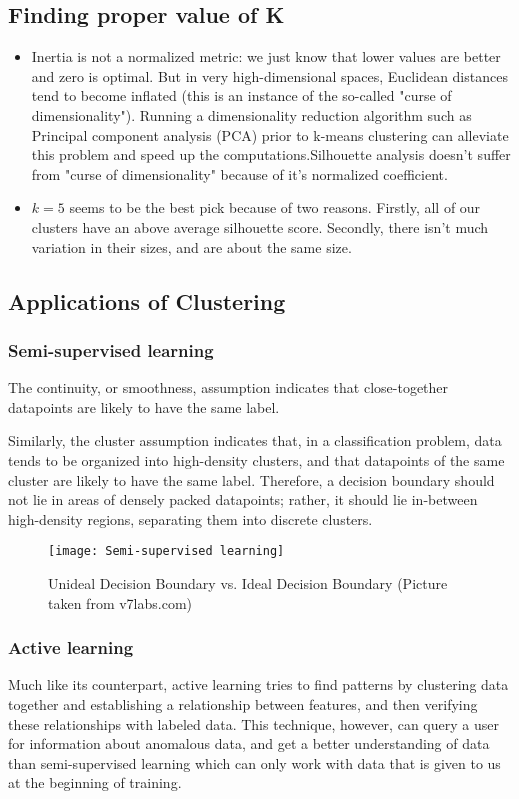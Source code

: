 \documentclass[12pt,onecolumn,a4paper]{article}
\begin{document}
\subsection{Finding proper value of K}
\begin{itemize}
	\item Inertia is not a normalized metric: we just know that lower values are better and zero is optimal. But in very high-dimensional spaces, Euclidean distances tend to become inflated (this is an instance of the so-called "curse of dimensionality"). Running a dimensionality reduction algorithm such as Principal component analysis (PCA) prior to k-means clustering can alleviate this problem and speed up the computations.Silhouette analysis doesn't suffer from "curse of dimensionality" because of it's normalized coefficient.
	\item $k = 5$ seems to be the best pick because of two reasons. Firstly, all of our clusters have an above average silhouette score. Secondly, there isn't much variation in their sizes, and are about the same size.
\end{itemize}
\subsection{Applications of Clustering}
\subsubsection{Semi-supervised learning}
The continuity, or smoothness, assumption indicates that close-together datapoints are likely to have the same label.

Similarly, the cluster assumption indicates that, in a classification problem, data tends to be organized into high-density clusters, and that datapoints of the same cluster are likely to have the same label. Therefore, a decision boundary should not lie in areas of densely packed datapoints; rather, it should lie in-between high-density regions, separating them into discrete clusters.
\begin{figure}[H]
	\centering
	\texttt{[image: Semi-supervised learning]}
	\caption{Unideal Decision Boundary vs. Ideal Decision Boundary (Picture taken from v7labs.com)}
\end{figure}
\subsubsection{Active learning}
Much like its counterpart, active learning tries to find patterns by clustering data together and establishing a relationship between features, and then verifying these relationships with labeled data. This technique, however, can query a user for information about anomalous data, and get a better understanding of data than semi-supervised learning which can only work with data that is given to us at the beginning of training.
\end{document}
